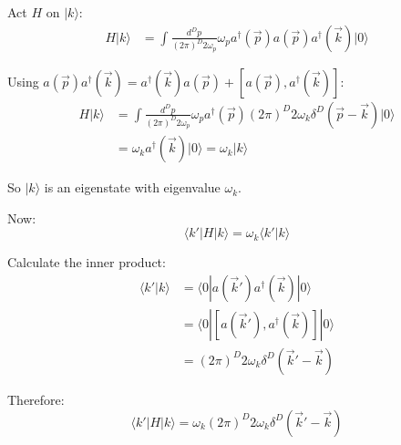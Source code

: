 \documentclass[11pt]{article}
\begin{document}
Act $H$ on $|k\rangle$:
\begin{align*}
    H|k\rangle &= \int \frac{d^Dp}{(2\pi)^D 2\omega_p} \omega_p a^\dagger(\vec{p})a(\vec{p}) a^\dagger(\vec{k})|0\rangle
\end{align*}

Using $a(\vec{p})a^\dagger(\vec{k}) = a^\dagger(\vec{k})a(\vec{p}) + [a(\vec{p}), a^\dagger(\vec{k})]$:
\begin{align*}
    H|k\rangle &= \int \frac{d^Dp}{(2\pi)^D 2\omega_p} \omega_p a^\dagger(\vec{p}) (2\pi)^D 2\omega_k \delta^D(\vec{p}-\vec{k}) |0\rangle \\
    &= \omega_k a^\dagger(\vec{k})|0\rangle = \omega_k |k\rangle
\end{align*}

So $|k\rangle$ is an eigenstate with eigenvalue $\omega_k$.

Now:
\[ \langle k'|H|k\rangle = \omega_k \langle k'|k\rangle \]

Calculate the inner product:
\begin{align*}
    \langle k'|k\rangle &= \langle 0|a(\vec{k}') a^\dagger(\vec{k})|0\rangle \\
    &= \langle 0| [a(\vec{k}'), a^\dagger(\vec{k})] |0\rangle \\
    &= (2\pi)^D 2\omega_k \delta^D(\vec{k}'-\vec{k})
\end{align*}

Therefore:
\[ \boxed{\langle k'|H|k\rangle = \omega_k (2\pi)^D 2\omega_k \delta^D(\vec{k}'-\vec{k})} \]
\end{document}
